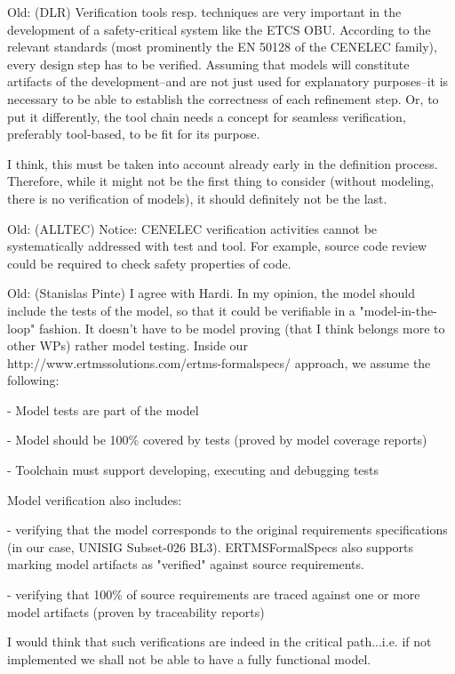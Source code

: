 \documentclass[11pt, a4paper]{article}
\newcommand{\oldtext}[1]{{Old: \scriptsize #1}}
\begin{document}
 


\oldtext{(DLR)
Verification tools resp. techniques are very important in the development of a safety-critical system like the ETCS OBU. According to the relevant standards (most prominently the EN 50128 of the CENELEC family), every design step has to be verified. Assuming that models will constitute artifacts of the development--and are not just used for explanatory purposes--it is necessary to be able to establish the correctness of each refinement step. Or, to put it differently, the tool chain needs a concept for seamless verification, preferably tool-based, to be fit for its purpose.

I think, this must be taken into account already early in the
definition process. Therefore, while it might not be the first thing
to consider (without modeling, there is no verification of models), it
should definitely not be the last.}


\oldtext{(ALLTEC) Notice: CENELEC verification activities cannot be systematically addressed with test and tool. For example, source code review could be required to check safety properties of code.}
\oldtext{(Stanislas Pinte)
I agree with Hardi.
In my opinion, the model should include the tests of the model, so that it could be verifiable in a "model-in-the-loop" fashion.
It doesn't have to be model proving (that I think belongs more to other WPs) rather model testing.
Inside our http://www.ertmssolutions.com/ertms-formalspecs/ approach, we assume the following:

- Model tests are part of the model

- Model should be 100\% covered by tests (proved by model coverage reports)

- Toolchain must support developing, executing and debugging tests

Model verification also includes:

- verifying that the model corresponds to the original requirements specifications (in our case, UNISIG Subset-026 BL3). ERTMSFormalSpecs also supports marking model artifacts as "verified" against source requirements.

- verifying that 100\% of source requirements are traced against one or more model artifacts (proven by traceability reports)

I would think that such verifications are indeed in the critical
path...i.e. if not implemented we shall not be able to have a fully
functional model.}
\end{document}
